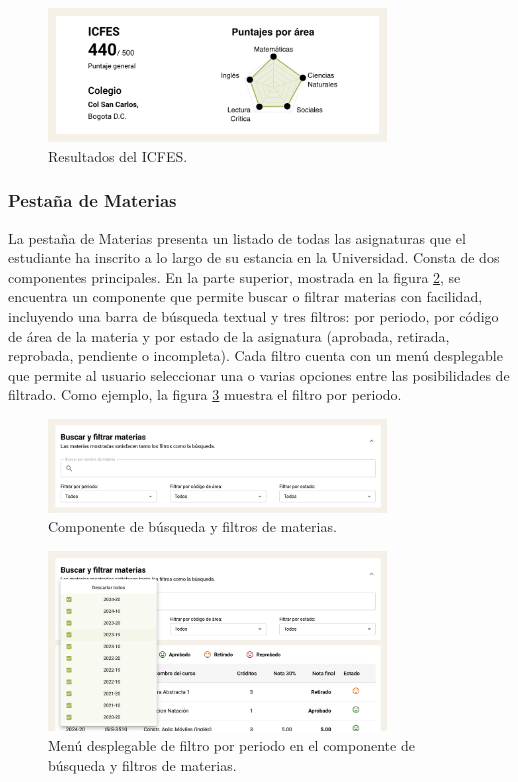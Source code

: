 \begin{figure}[H]
  \centering
  \includegraphics[width=0.8\textwidth]{img/nes/icfes.png}
  \caption{Resultados del ICFES.}
  \label{fig:icfes}
\end{figure}

\subsubsection{Pestaña de Materias}

La pestaña de Materias presenta un listado de todas las asignaturas que el estudiante ha inscrito a lo largo de su estancia en la Universidad. Consta de dos componentes principales. En la parte superior, mostrada en la figura \ref{fig:filtros_materias}, se encuentra un componente que permite buscar o filtrar materias con facilidad, incluyendo una barra de búsqueda textual y tres filtros: por periodo, por código de área de la materia y por estado de la asignatura (aprobada, retirada, reprobada, pendiente o incompleta). Cada filtro cuenta con un menú desplegable que permite al usuario seleccionar una o varias opciones entre las posibilidades de filtrado. Como ejemplo, la figura \ref{fig:filtro_periodo_materias} muestra el filtro por periodo.

\begin{figure}[H]
  \centering
  \includegraphics[width=0.8\textwidth]{img/nes/filtros_materias.png}
  \caption{Componente de búsqueda y filtros de materias.}
  \label{fig:filtros_materias}
\end{figure}

\begin{figure}[H]
  \centering
  \includegraphics[width=0.8\textwidth]{img/nes/filtro_periodo_materias.png}
  \caption{Menú desplegable de filtro por periodo en el componente de búsqueda y filtros de materias.}
  \label{fig:filtro_periodo_materias}
\end{figure}


